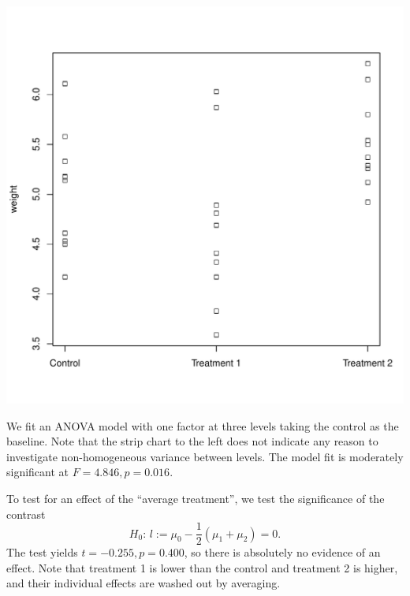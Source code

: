 \documentclass{homework}
\begin{document}
\begin{solution}
  \begin{minipage}{.4\textwidth}
  \includegraphics[width=\textwidth]{strip_plant.pdf}
  \end{minipage}
  \begin{minipage}{.55\textwidth}
  We fit an ANOVA model with one factor at three levels taking the control as the baseline. Note that the strip chart to the left does not indicate any reason to investigate non-homogeneous variance between levels.  The model fit is moderately significant at $F=4.846,p=0.016$.
  
  To test for an effect of the ``average treatment'', we test the significance of the contrast 
  $$H_0:\,l:= \mu_0 - \frac12(\mu_1 + \mu_2) = 0.$$  
The test yields $t=-0.255,p=0.400$, so there is absolutely no evidence of an effect.  Note that treatment 1 is lower than the control and treatment 2 is higher, and their individual effects are washed out by averaging.  
\end{minipage}
\end{solution}
\end{document}
